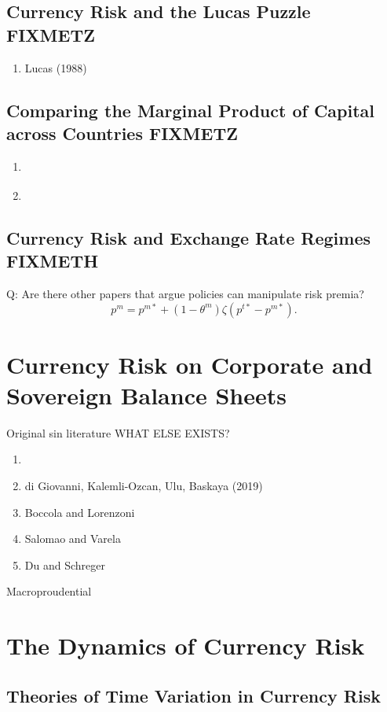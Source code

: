 \documentclass{ar-1col}
\begin{document}
\subsection{Currency Risk and the Lucas Puzzle FIXMETZ}
\begin{enumerate}
\item Lucas (1988)
\end{enumerate}
\subsection{Comparing the Marginal Product of Capital across Countries FIXMETZ}
\begin{enumerate}
\item \citet{CaselliFeyrer2007}
\item \citet{Monge-Naranjo2019}
\end{enumerate}
\subsection{Currency Risk and Exchange Rate Regimes FIXMETH}
Q: Are there other papers that argue policies can manipulate risk
premia?
\begin{equation*}
  p^m = p^{m \ast} + (1 - \theta^m) \zeta (p^{t \ast} - p^{m \ast}).
\end{equation*}

\section{Currency Risk on Corporate and Sovereign Balance Sheets}
Original sin literature WHAT ELSE EXISTS?
\begin{enumerate}
\item \citet{Richers2019}
\item di Giovanni, Kalemli-Ozcan, Ulu, Baskaya (2019)
\item Boccola and Lorenzoni
\item Salomao and Varela
\item Du and Schreger
\end{enumerate} 
Macroproudential


\section{The Dynamics of Currency Risk}


\subsection{Theories of Time Variation in Currency Risk}
\end{document}
